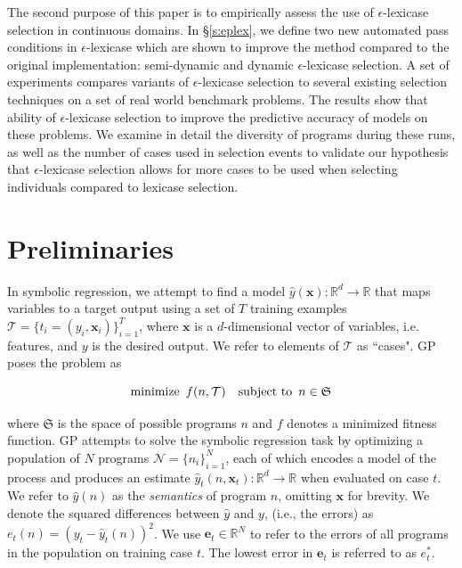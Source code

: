 \documentclass[twoside]{article}
\begin{document}
The second purpose of this paper is to empirically assess the use of $\epsilon$-lexicase selection in continuous domains. In \S\ref{s:eplex}, we define two new automated pass conditions in $\epsilon$-lexicase which are shown to improve the method compared to the original implementation: semi-dynamic and dynamic $\epsilon$-lexicase selection. A set of experiments compares variants of $\epsilon$-lexicase selection to several existing selection techniques on a set of real world benchmark problems. The results show that ability of $\epsilon$-lexicase selection to improve the predictive accuracy of models on these problems. We examine in detail the diversity of programs during these runs, as well as the number of cases used in selection events to validate our hypothesis that $\epsilon$-lexicase selection allows for more cases to be used when selecting individuals compared to lexicase selection.   


\section{Preliminaries}
In symbolic regression, we attempt to find a model $\hat{y}(\mathbf{x}): \mathbb{R}^d \rightarrow \mathbb{R}$ that maps variables to a target output using a set of $T$ training examples $\mathcal{T} = \{t_i = (y_i,\mathbf{x}_i)\}_{i=1}^T$, where $\mathbf{x}$ is a $d$-dimensional vector of variables, i.e. features, and $y$ is the desired output. We refer to elements of $\mathcal{T}$ as ``cases". GP poses the problem as

\begin{equation} \label{eq:gp}
\text{minimize} \hspace{0.5em} {f(n,\mathcal{T})} \hspace{1em} \text{subject to} \hspace{0.5em} {n \in \mathfrak{S}}
\end{equation}

where $\mathfrak{S}$ is the space of possible programs $n$ and $f$ denotes a minimized fitness function. GP attempts to solve the symbolic regression task by optimizing a population of $N$ programs $\mathcal{N} = \{n_i\}_{i=1}^N$, each of which encodes a model of the process and produces an estimate  $\hat{y}_t(n,\mathbf{x}_t): \mathbb{R}^d \rightarrow \mathbb{R}$ when evaluated on case $t$. We refer to $\hat{y}(n)$ as the {\it semantics} of program $n$, omitting $\mathbf{x}$ for brevity. We denote the squared differences between $\hat{y}$ and $y$, (i.e., the errors) as $e_t(n) = (y_t - \hat{y}_t(n))^2$.  We use $\mathbf{e}_t \in \mathbb{R}^N$ to refer to the errors of all programs in the population on training case $t$. The lowest error in $\mathbf{e}_t$ is referred to as $e^*_t$. 
\end{document}

